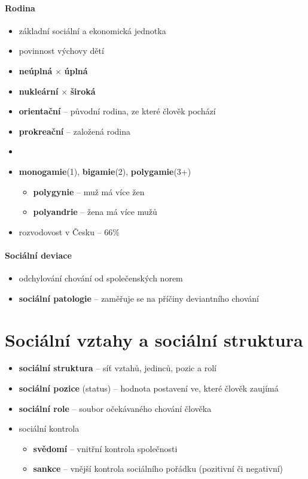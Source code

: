 \paragraph{Rodina}
\begin{itemize}
\item základní sociální a ekonomická jednotka
\item povinnost výchovy dětí
\item \textbf{neúplná} $\times$ \textbf{úplná}
\item \textbf{nukleární} $\times$ \textbf{široká}
\item \textbf{orientační} -- původní rodina, ze které člověk pochází
\item \textbf{prokreační} -- založená rodina
\item 
\item \textbf{monogamie}(1), \textbf{bigamie}(2), \textbf{polygamie}(3+)
\begin{itemize}
\item \textbf{polygynie} -- muž má více žen
\item \textbf{polyandrie} -- žena má více mužů
\end{itemize}
\item rozvodovost v Česku -- 66\%
\end{itemize}

\paragraph{Sociální deviace}
\begin{itemize}
\item odchylování chování od společenských norem
\item \textbf{sociální patologie} -- zaměřuje se na příčiny deviantního chování
\end{itemize}




\section{Sociální vztahy a sociální struktura}
\begin{itemize}
\item \textbf{sociální struktura} -- síť vztahů, jedinců, pozic a rolí
\item \textbf{sociální pozice} (status) -- hodnota postavení ve, které člověk zaujímá
\item \textbf{sociální role} -- soubor očekávaného chování člověka
\item sociální kontrola
\begin{itemize}
\item \textbf{svědomí} -- vnitřní kontrola společnosti
\item \textbf{sankce} -- vnější kontrola sociálního pořádku (pozitivní či negativní)
\end{itemize}
\end{itemize}

